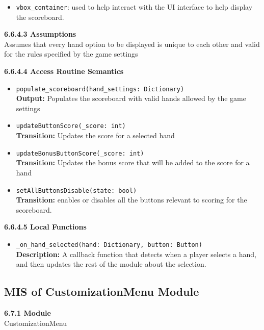 \documentclass[12pt, titlepage]{article}
\begin{document}
\begin{itemize}
	\item \texttt{vbox\_container}: used to help interact with the UI interface to help display the scoreboard. 
\end{itemize}

\textbf{6.6.4.3 Assumptions}\\
Assumes that every hand option to be displayed is unique to each other and valid for the rules specified by the game settings

\textbf{6.6.4.4 Access Routine Semantics}
\begin{itemize}

	\item \texttt{populate\_scoreboard(hand\_settings: Dictionary)}\\
	\textbf{Output:} Populates the scoreboard with valid hands allowed by the game settings
	
	
	\item \texttt{updateButtonScore(\_score: int)}\\
	\textbf{Transition:} Updates the score for a selected hand
	
	
	\item \texttt{updateBonusButtonScore(\_score: int)}\\
	\textbf{Transition:} Updates the bonus score that will be added to the score for a hand
	
	
	\item \texttt{setAllButtonsDisable(state: bool)}\\
	\textbf{Transition:} enables or disables all the buttons relevant to scoring for the scoreboard.
	
	


\end{itemize}

\textbf{6.6.4.5 Local Functions}

\begin{itemize}
    \item \texttt{\_on\_hand\_selected(hand: Dictionary, button: Button)}\\
    \textbf{Description:} A callback function that detects when a player selects a hand, and then updates the rest of the module about the selection.

\end{itemize}


\subsection{MIS of CustomizationMenu Module}
\textbf{6.7.1 Module}\\
 CustomizationMenu\\
\end{document}
